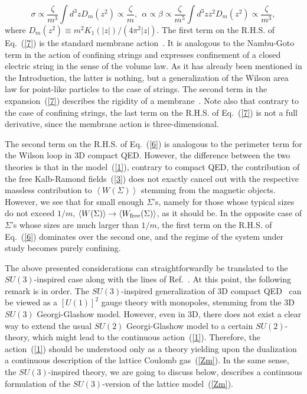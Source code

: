 \documentclass[a4paper,12pt]{article}
\begin{document}
$$\sigma\propto\frac{\zeta}{m^3}\int d^3zD_m\left(z^2\right)\propto 
\frac{\zeta}{m},~~ 
\alpha\propto\beta\propto\frac{\zeta}{m^5}\int d^3zz^2D_m\left(z^2\right)\propto 
\frac{\zeta}{m^3},$$
where $D_m\left(z^2\right)\equiv m^2K_1(|z|)/(4\pi^2|z|)$.
The first term on the R.H.S. of Eq.~(\ref{7}) is the standard membrane action~\cite{sma}.
It is analogous to the Nambu-Goto term in the action of confining strings 
and expresses confinement of a closed electric string in the 
sense of the volume law. As it has already been mentioned in the Introduction, 
the latter is nothing, but a generalization of the Wilson area law for point-like
particles to the case of strings. The second term in the expansion~(\ref{7}) 
describes the rigidity of a membrane~\cite{ridmem}. Note also that contrary to the case of confining strings,
the last term on the R.H.S. of Eq.~(\ref{7}) is not a full derivative, since the membrane action is 
three-dimensional.
 
The second term on the R.H.S. of Eq.~(\ref{6}) is analogous to the perimeter term for the Wilson loop
in 3D compact QED. However, the difference between the two theories is that in the model~(\ref{1}),
contrary to compact QED, the contribution of the free Kalb-Ramond fields~(\ref{3}) does not exactly cancel out  
with the respective massless contribution to $\left<W(\Sigma)\right>$ stemming from the magnetic objects.
However, we see that for small enough $\Sigma$'s, namely for those whose typical sizes do not exceed $1/m$, 
$\left<W(\Sigma)\right>\to\left<W_{\rm free}(\Sigma)\right>$, as it should be. In the opposite case
of $\Sigma$'s whose sizes are much larger than $1/m$, the first term on the R.H.S. of Eq.~(\ref{6}) 
dominates over the second one, and the regime of the system under study becomes purely confining.

The above presented considerations can straightforwardly be translated to the $SU(3)$-inspired case along with the 
lines of Ref.~\cite{su3}. At this point, the following remark is in order.
The $SU(3)$-inspired generalization of 3D compact QED~\cite{ws} can be viewed as 
a $[U(1)]^2$ gauge theory with monopoles, stemming from the 3D $SU(3)$ Georgi-Glashow model.  However, 
even in 3D, there does not exist a clear way to extend the usual $SU(2)$ Georgi-Glashow model
to a certain $SU(2)$-theory, which might lead to the continuous action~(\ref{1}). Therefore, the action~(\ref{1}) should be 
understood only as a theory yielding upon the dualization a continuous description of the lattice Coulomb gas~(\ref{Zm}). In the same sense, the 
$SU(3)$-inspired theory, we are going to discuss below, describes a continuous formulation of the $SU(3)$-version
of the lattice model~(\ref{Zm}). 
\end{document}

